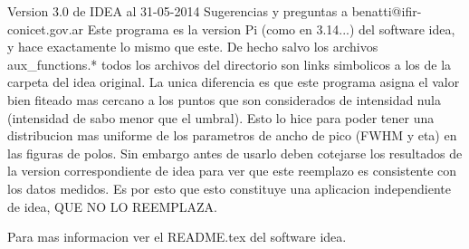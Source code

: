 Version 3.0 de IDEA al 31-05-2014
Sugerencias y preguntas a benatti@ifir-conicet.gov.ar
Este programa es la version Pi (como en 3.14...) del software idea, y hace exactamente lo mismo que este. 
De hecho salvo los archivos aux_functions.* todos los archivos del directorio son links simbolicos a los de la carpeta del idea original.
La unica diferencia es que este programa asigna el valor bien fiteado mas cercano a los puntos que son considerados de intensidad nula (intensidad de sabo menor que el umbral).
Esto lo hice para poder tener una distribucion mas uniforme de los parametros de ancho de pico (FWHM y eta) en las figuras de polos.
Sin embargo antes de usarlo deben cotejarse los resultados de la version correspondiente de idea para ver que este reemplazo es consistente con los datos medidos.
Es por esto que esto constituye una aplicacion independiente de idea, QUE NO LO REEMPLAZA.

Para mas informacion ver el README.tex del software idea.

